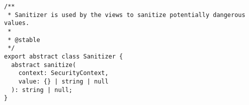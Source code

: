 \begin{verbatim}
/**
 * Sanitizer is used by the views to sanitize potentially dangerous values.
 *
 * @stable
 */
export abstract class Sanitizer {
  abstract sanitize(
    context: SecurityContext,
    value: {} | string | null
  ): string | null;
}
\end{verbatim}
